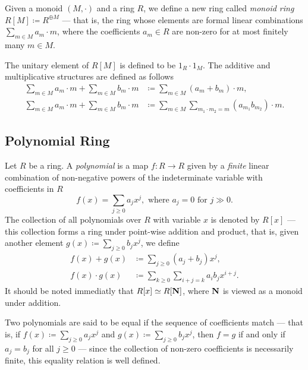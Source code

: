 %
\begin{definition}
\label{def:monoid-ring}
Given a monoid \((M, \cdot)\) and a ring \(R\), we define a new ring called
\emph{monoid ring} \(R[M] \coloneq R^{\oplus M}\) --- that is, the ring whose
elements are formal linear combinations \(\sum_{m \in M} a_m \cdot m\), where
the coefficients \(a_m \in R\) are non-zero for at most finitely many
\(m \in M\).

The unitary element of \(R[M]\) is defined to be \(1_R \cdot 1_{M}\). The
additive and multiplicative structures are defined as follows
\begin{align*}
  \sum_{m \in M} a_m \cdot m + \sum_{m \in M} b_m \cdot m
  &\coloneq \sum_{m \in M} (a_m + b_m) \cdot m, \\
  \sum_{m \in M} a_m \cdot m + \sum_{m \in M} b_m \cdot m
  &\coloneq \sum_{m \in M} \sum_{m_1 \cdot m_2 = m} (a_{m_1} b_{m_2}) \cdot m.
\end{align*}
\end{definition}
%

\subsection{Polynomial Ring}

%
\begin{definition}[Polynomial]
\label{def:polynomial}
Let \(R\) be a ring. A \emph{polynomial} is a map \(f: R \to R\) given by a
\emph{finite} linear combination of non-negative powers of the indeterminate
variable with coefficients in \(R\)
\[
  f(x) = \sum_{j \geq 0} a_j x^j, \text{ where } a_j = 0 \text{ for } j \gg 0.
\]
The collection of all polynomials over \(R\) with variable \(x\) is denoted by
\(R[x]\) --- this collection forms a ring under point-wise addition and product,
that is, given another element \(g(x) \coloneq \sum_{j \geq 0} b_j x^j\), we
define
\begin{align*}
  f(x) + g(x) &\coloneq \sum_{j \geq 0} (a_j + b_j) x^j,\\
  f(x) \cdot g(x) &\coloneq \sum_{k \geq 0} \sum_{i + j = k} a_i b_j x^{i + j}.
\end{align*}
It should be noted immediatly that \(R[x] \simeq R[\mathbf{N}]\), where \(\mathbf{N}\) is viewed
as a monoid under addition.
\end{definition}
%

Two polynomials are said to be equal if the sequence of coefficients match ---
that is, if \(f(x) \coloneq \sum_{j \geq 0} a_j x^j\) and
\(g(x) \coloneq \sum_{j \geq 0} b_j x^j\), then \(f = g\) if and only if
\(a_j = b_j\) for all \(j \geq 0\) --- since the collection of non-zero
coefficients is necessarily finite, this equality relation is well defined.

